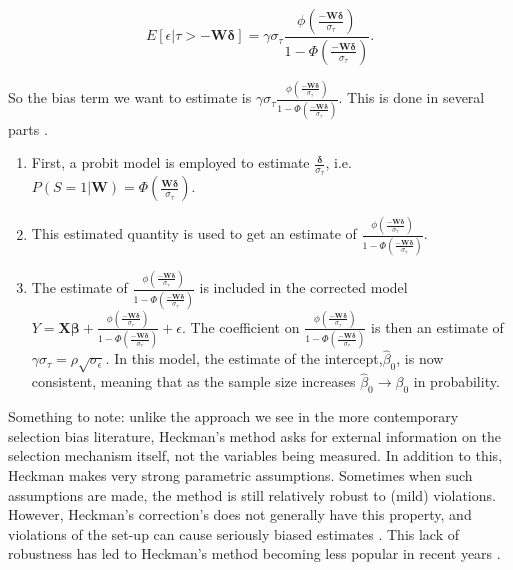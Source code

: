 \documentclass[12pt,twoside]{reedthesis}
\theoremstyle{definition}
\begin{document}
$$E[\epsilon | \tau > -\mathbf{W} \boldsymbol{\delta}] = \gamma \sigma_{\tau}\frac{\phi(\frac{-\mathbf{W} \boldsymbol{\delta}}{\sigma_\tau})}{1 - \Phi(\frac{-\mathbf{W} \boldsymbol{\delta}}{\sigma_\tau})}.$$				

So the bias term  we want to estimate is $\gamma\sigma_{\tau}\frac{\phi(\frac{-\mathbf{W} \boldsymbol{\delta}}{\sigma_\tau})}{1 - \Phi(\frac{-\mathbf{W} \boldsymbol{\delta}}{\sigma_\tau})}$. This is done in several parts \cite{Heckman_1979}.

\begin{enumerate}
\item  First, a probit model is employed to estimate $\frac{\boldsymbol{\delta}}{\sigma_\tau}$, i.e. $P(S = 1 | \mathbf{W}) = \Phi(\frac{ \mathbf{W} \boldsymbol{\delta}}{\sigma_{\tau}})$. 

\item This estimated quantity is used to get an estimate of  $\frac{\phi(\frac{-\mathbf{W} \boldsymbol{\delta}}{\sigma_\tau})}{1 - \Phi(\frac{-\mathbf{W} \boldsymbol{\delta}}{\sigma_\tau})}$.

\item The estimate of $\frac{\phi(\frac{-\mathbf{W} \boldsymbol{\delta}}{\sigma_\tau})}{1 - \Phi(\frac{-\mathbf{W} \boldsymbol{\delta}}{\sigma_\tau})}$ is included in the corrected model $Y = \mathbf{X} \boldsymbol{\beta} + \frac{\phi(\frac{-\mathbf{W} \boldsymbol{\delta}}{\sigma_\tau})}{1 - \Phi(\frac{-\mathbf{W} \boldsymbol{\delta}}{\sigma_\tau})} + \epsilon$. The coefficient on $\frac{\phi(\frac{-\mathbf{W} \boldsymbol{\delta}}{\sigma_\tau})}{1 - \Phi(\frac{-\mathbf{W} \boldsymbol{\delta}}{\sigma_\tau})}$ is then an estimate of $\gamma \sigma_\tau = \rho \sqrt{\sigma_\epsilon}$. In this model, the estimate of the intercept,$\hat \beta_0$, is now consistent, meaning that as the sample size increases $\hat \beta_0 \rightarrow \beta_0$ in probability.
\end{enumerate}

Something to note: unlike the approach we see in the more contemporary selection bias literature, Heckman's method asks for external information on the selection mechanism itself, not the variables being measured. In addition to this, Heckman makes very strong parametric assumptions. Sometimes when such assumptions are made, the method is still relatively robust to (mild) violations.  However, Heckman's correction's does not generally have this property, and violations of the set-up can cause seriously biased estimates \citep{Little_1986}. This lack of robustness has led to Heckman's method becoming less popular in recent years \citep{Bushway_2007}.
\end{document}
